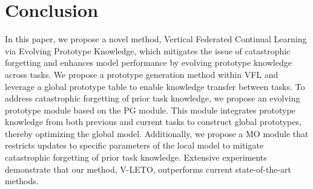 \section{Conclusion}
In this paper, we propose a novel method, Vertical Federated Continual Learning via Evolving Prototype Knowledge, which mitigates the issue of catastrophic forgetting and enhances model performance by evolving prototype knowledge across tasks. 
We propose a prototype generation method within VFL and leverage a global prototype table to enable knowledge transfer between tasks. 
To address catastrophic forgetting of prior task knowledge, we propose an evolving prototype module based on the PG module. This module integrates prototype knowledge from both previous and current tasks to construct global prototypes, thereby optimizing the global model.
Additionally, we propose a MO module that restricts updates to specific parameters of the local model to mitigate catastrophic forgetting of prior task knowledge.
Extensive experiments demonstrate that our method, V-LETO, outperforms current state-of-the-art methods.

